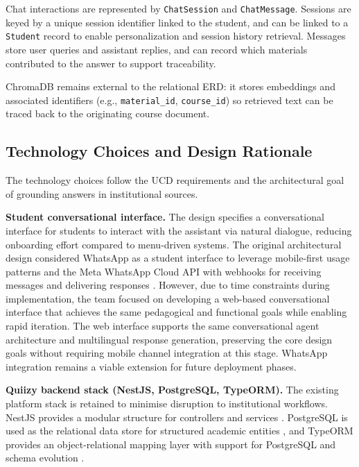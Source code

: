 \documentclass[a4paper,9pt,twocolumn]{extarticle}
\begin{document}
Chat interactions are represented by \texttt{ChatSession} and
\texttt{ChatMessage}. Sessions are keyed by a unique session identifier linked
to the student, and can be linked to a \texttt{Student} record to enable
personalization and session history retrieval. Messages store user queries and assistant replies, and can
record which materials contributed to the answer to support traceability.

ChromaDB remains external to the relational ERD: it stores embeddings and
associated identifiers (e.g., \texttt{material\_id}, \texttt{course\_id}) so
retrieved text can be traced back to the originating course document.

\subsection{Technology Choices and Design Rationale}
\label{sec:model:rationale}

The technology choices follow the UCD requirements and the architectural
goal of grounding answers in institutional sources.

\textbf{Student conversational interface.} The design specifies a conversational
interface for students to interact with the assistant via natural dialogue, reducing
onboarding effort compared to menu-driven systems. The original architectural design
considered WhatsApp as a student interface to leverage mobile-first usage patterns and
the Meta WhatsApp Cloud API with webhooks for receiving messages and delivering responses
\cite{metaWhatsAppCloudApi}. However, due to time constraints during implementation, the
team focused on developing a web-based conversational interface that achieves the same
pedagogical and functional goals while enabling rapid iteration. The web interface supports
the same conversational agent architecture and multilingual response generation, preserving
the core design goals without requiring mobile channel integration at this stage. WhatsApp
integration remains a viable extension for future deployment phases.

\textbf{Quiizy backend stack (NestJS, PostgreSQL, TypeORM).} The existing
platform stack is retained to minimise disruption to institutional
workflows. NestJS provides a modular structure for controllers and
services \cite{nestjsDocs}. PostgreSQL is used as the relational data
store for structured academic entities \cite{postgresDocs}, and TypeORM
provides an object-relational mapping layer with support for PostgreSQL
and schema evolution \cite{typeormDocs}.
\end{document}
